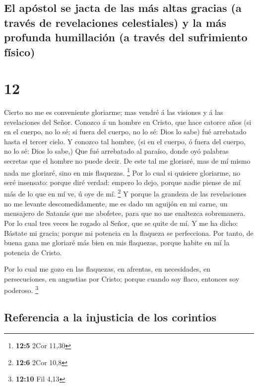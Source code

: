 \hypertarget{el-apuxf3stol-se-jacta-de-las-muxe1s-altas-gracias-a-travuxe9s-de-revelaciones-celestiales-y-la-muxe1s-profunda-humillaciuxf3n-a-travuxe9s-del-sufrimiento-fuxedsico}{%
\subsection{El apóstol se jacta de las más altas gracias (a través de
revelaciones celestiales) y la más profunda humillación (a través del
sufrimiento
físico)}\label{el-apuxf3stol-se-jacta-de-las-muxe1s-altas-gracias-a-travuxe9s-de-revelaciones-celestiales-y-la-muxe1s-profunda-humillaciuxf3n-a-travuxe9s-del-sufrimiento-fuxedsico}}

\hypertarget{section-11}{%
\section{12}\label{section-11}}

 Cierto no me es conveniente gloriarme; mas vendré á las
visiones y á las revelaciones del Señor.  Conozco á un
hombre en Cristo, que hace catorce años (si en el cuerpo, no lo sé; si
fuera del cuerpo, no lo sé: Dios lo sabe) fué arrebatado hasta el tercer
cielo.  Y conozco tal hombre, (si en el cuerpo, ó fuera
del cuerpo, no lo sé: Dios lo sabe,)  Que fué arrebatado
al paraíso, donde oyó palabras secretas que el hombre no puede decir.
 De este tal me gloriaré, mas de mí mismo nada me
gloriaré, sino en mis flaquezas. \footnote{\textbf{12:5} 2Cor 11,30}
 Por lo cual si quisiere gloriarme, no seré insensato:
porque diré verdad: empero lo dejo, porque nadie piense de mí más de lo
que en mí ve, ú oye de mí. \footnote{\textbf{12:6} 2Cor 10,8}
 Y porque la grandeza de las revelaciones no me levante
descomedidamente, me es dado un aguijón en mi carne, un mensajero de
Satanás que me abofetee, para que no me enaltezca sobremanera.
 Por lo cual tres veces he rogado al Señor, que se quite
de mí.  Y me ha dicho: Bástate mi gracia; porque mi
potencia en la flaqueza se perfecciona. Por tanto, de buena gana me
gloriaré más bien en mis flaquezas, porque habite en mí la potencia de
Cristo.

 Por lo cual me gozo en las flaquezas, en afrentas, en
necesidades, en persecuciones, en angustias por Cristo; porque cuando
soy flaco, entonces soy poderoso. \footnote{\textbf{12:10} Fil 4,13}

\hypertarget{referencia-a-la-injusticia-de-los-corintios}{%
\subsection{Referencia a la injusticia de los
corintios}\label{referencia-a-la-injusticia-de-los-corintios}}

